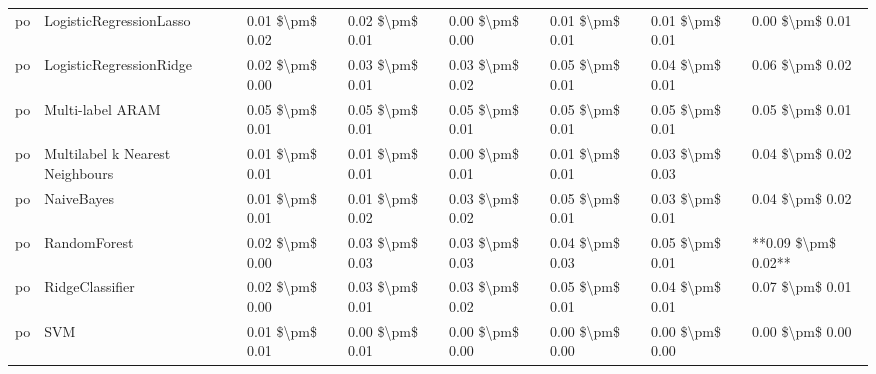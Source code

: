 \begin{tabular}{llllllll}
      po &         LogisticRegressionLasso & 0.01 \$\textbackslash pm\$ 0.02 &           0.02 \$\textbackslash pm\$ 0.01 &       0.00 \$\textbackslash pm\$ 0.00 &        0.01 \$\textbackslash pm\$ 0.01 &                         0.01 \$\textbackslash pm\$ 0.01 &     0.00 \$\textbackslash pm\$ 0.01 \\
      po &         LogisticRegressionRidge & 0.02 \$\textbackslash pm\$ 0.00 &           0.03 \$\textbackslash pm\$ 0.01 &       0.03 \$\textbackslash pm\$ 0.02 &        0.05 \$\textbackslash pm\$ 0.01 &                         0.04 \$\textbackslash pm\$ 0.01 &     0.06 \$\textbackslash pm\$ 0.02 \\
      po &                Multi-label ARAM & 0.05 \$\textbackslash pm\$ 0.01 &           0.05 \$\textbackslash pm\$ 0.01 &       0.05 \$\textbackslash pm\$ 0.01 &        0.05 \$\textbackslash pm\$ 0.01 &                         0.05 \$\textbackslash pm\$ 0.01 &     0.05 \$\textbackslash pm\$ 0.01 \\
      po & Multilabel k Nearest Neighbours & 0.01 \$\textbackslash pm\$ 0.01 &           0.01 \$\textbackslash pm\$ 0.01 &       0.00 \$\textbackslash pm\$ 0.01 &        0.01 \$\textbackslash pm\$ 0.01 &                         0.03 \$\textbackslash pm\$ 0.03 &     0.04 \$\textbackslash pm\$ 0.02 \\
      po &                      NaiveBayes & 0.01 \$\textbackslash pm\$ 0.01 &           0.01 \$\textbackslash pm\$ 0.02 &       0.03 \$\textbackslash pm\$ 0.02 &        0.05 \$\textbackslash pm\$ 0.01 &                         0.03 \$\textbackslash pm\$ 0.01 &     0.04 \$\textbackslash pm\$ 0.02 \\
      po &                    RandomForest & 0.02 \$\textbackslash pm\$ 0.00 &           0.03 \$\textbackslash pm\$ 0.03 &       0.03 \$\textbackslash pm\$ 0.03 &        0.04 \$\textbackslash pm\$ 0.03 &                         0.05 \$\textbackslash pm\$ 0.01 & **0.09 \$\textbackslash pm\$ 0.02** \\
      po &                 RidgeClassifier & 0.02 \$\textbackslash pm\$ 0.00 &           0.03 \$\textbackslash pm\$ 0.01 &       0.03 \$\textbackslash pm\$ 0.02 &        0.05 \$\textbackslash pm\$ 0.01 &                         0.04 \$\textbackslash pm\$ 0.01 &     0.07 \$\textbackslash pm\$ 0.01 \\
      po &                             SVM & 0.01 \$\textbackslash pm\$ 0.01 &           0.00 \$\textbackslash pm\$ 0.01 &       0.00 \$\textbackslash pm\$ 0.00 &        0.00 \$\textbackslash pm\$ 0.00 &                         0.00 \$\textbackslash pm\$ 0.00 &     0.00 \$\textbackslash pm\$ 0.00 \\

\end{tabular}
